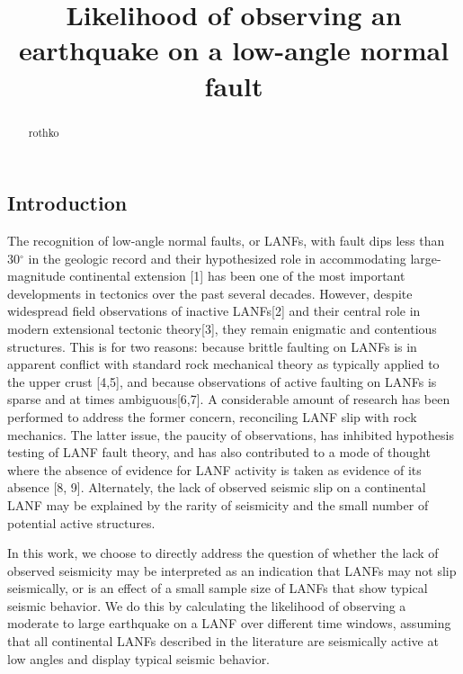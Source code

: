 \documentclass[twocolumn,grl]{AGUTeX}
\begin{document}
\title{Likelihood of observing an earthquake on a low-angle normal fault}



\begin{abstract}
rothko
\end{abstract}

\begin{article}

\section{Introduction}
The recognition of low-angle normal faults, or LANFs, with fault dips less than 30$^\circ$ in the geologic record and their hypothesized role in accommodating large-magnitude continental extension [1] has been one of the most important developments in tectonics over the past several decades.
However, despite widespread field observations of inactive LANFs[2] and their central role in modern extensional tectonic theory[3], they remain enigmatic and contentious structures. 
This is for two reasons: because brittle faulting on LANFs is in apparent conflict with standard rock mechanical theory as typically applied to the upper crust [4,5], and because observations of active faulting on LANFs is sparse and at times ambiguous[6,7].
A considerable amount of research has been performed to address the former concern, reconciling LANF slip with rock mechanics.
The latter issue, the paucity of observations, has inhibited hypothesis testing of LANF fault theory, and has also contributed to a mode of thought where the absence of evidence for LANF activity is taken as evidence of its absence [8, 9].
Alternately, the lack of observed seismic slip on a continental LANF may be explained by the rarity of seismicity and the small number of potential active structures.


In this work, we choose to directly address the question of whether the lack of observed seismicity may be interpreted as an indication that LANFs may not slip seismically, or is an effect of a small sample size of LANFs that show typical seismic behavior.  We do this by calculating the likelihood of observing a moderate to large earthquake on a LANF over different time windows, assuming that all continental LANFs described in the literature are seismically active at low angles and display typical seismic behavior.


\end{article}
\end{document}
